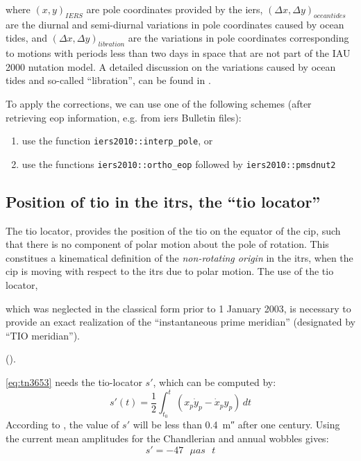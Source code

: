 where \((x, y)_{IERS}\) are pole coordinates provided by the \gls{iers}, 
\((\Delta x, \Delta y)_{ocean tides}\) are the diurnal and semi-diurnal variations 
in pole coordinates caused by ocean tides, and \((\Delta x, \Delta y)_{libration}\) 
are the variations in pole coordinates corresponding to motions with periods 
less than two days in space that are not part of the IAU 2000 nutation model.
A detailed discussion on the variations caused by ocean tides and so-called ``libration'', 
can be found in \cite{iers2010}.

To apply the corrections, we can use one of the following schemes (after retrieving 
\gls{eop} information, e.g. from \gls{iers} Bulletin files):

\begin{enumerate}
  \item use the function \texttt{iers2010::interp\_pole}, or
  \item use the functions \texttt{iers2010::ortho\_eop} followed by \texttt{iers2010::pmsdnut2}
\end{enumerate}

\subsection{Position of \gls{tio} in the \gls{itrs}, the ``\gls{tio} locator''}
\label{ssec:position-of-the-tio-in-the-itrs}
The \gls{tio} locator, provides the position of the \gls{tio} on the equator
of the \gls{cip}, such that there is no component of polar motion about the pole 
of rotation. This constitues a kinematical definition of the \emph{non-rotating origin} 
in the \gls{itrs}, when the \gls{cip} is moving with respect to the \gls{itrs} 
due to polar motion. The use of the \gls{tio} locator, 
\begin{displayquote}
which was neglected in the classical form prior to 1 January 2003, is
necessary to provide an exact realization of the ``instantaneous prime meridian'' 
(designated by ``TIO meridian'').
\end{displayquote} (\cite{iers2010}).

\ref{eq:tn3653} needs the \gls{tio}-locator \(s'\), which can be computed by:
\begin{equation}
  \label{eq:tn3654}
  s'(t) = \frac{1}{2} \int_{t_0}^{t} \left( 
    x_p \dot{y}_p - \dot{x}_p y_p \right) \,dt
\end{equation}
According to \cite{iers2010}, the value of \(s'\) will be less than 
\SI{0.4}{\milli\arcsecond} after one century. Using the current mean amplitudes 
for the Chandlerian and annual wobbles gives:
\begin{equation}
  \label{eq:tn36513}
  s' = -47 \text{ } \mu as \text{ } t
\end{equation}


